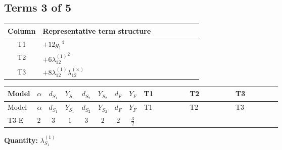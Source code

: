 \documentclass[8pt]{article}
\begin{document}
\begin{landscape}
\subsection*{Terms 3 of 5}
\begin{center}
\begin{tabular}{@{}c >{\raggedright\arraybackslash}p{0.82\linewidth}@{}}
\toprule
Column & Representative term structure \\
\midrule
T1 & \(\displaystyle +12 {g_1}^4\) \\
\midrule
T2 & \(\displaystyle +6 {\lambda_{12}^{(1)}}^2\) \\
\midrule
T3 & \(\displaystyle +8 {\lambda_{12}^{(1)}} {\lambda_{12}^{(\times)}}\) \\
\midrule
\bottomrule
\end{tabular}
\end{center}
\smallskip
\tiny
\begin{longtable}{@{}llcccccc >{\raggedright\arraybackslash}p{0.21\linewidth} >{\raggedright\arraybackslash}p{0.21\linewidth} >{\raggedright\arraybackslash}p{0.21\linewidth}@{}}
\toprule
Model & $\alpha$ & $d_{S_1}$ & $Y_{S_1}$ & $d_{S_2}$ & $Y_{S_2}$ & $d_F$ & $Y_F$ & T1 & T2 & T3 \\
\midrule
\endfirsthead
\toprule
Model & $\alpha$ & $d_{S_1}$ & $Y_{S_1}$ & $d_{S_2}$ & $Y_{S_2}$ & $d_F$ & $Y_F$ & T1 & T2 & T3 \\
\midrule
\endhead
T3-E & $2$ & $3$ & $1$ & $3$ & $2$ & $2$ & $\frac{3}{2}$ & \scriptsize\adjustbox{max width=\linewidth}{$\begin{gathered} +12 {g_1}^4\end{gathered}$} & \scriptsize\adjustbox{max width=\linewidth}{$\begin{gathered} +6 {\lambda_{12}^{(1)}}^2\end{gathered}$} & \scriptsize\adjustbox{max width=\linewidth}{$\begin{gathered} +8 {\lambda_{12}^{(1)}} {\lambda_{12}^{(\times)}}\end{gathered}$} \\
\midrule
\bottomrule
\end{longtable}
\clearpage
\noindent\textbf{Quantity: }$\lambda_{S_1}^{(1)}$\par\smallskip

\end{landscape}
\end{document}
